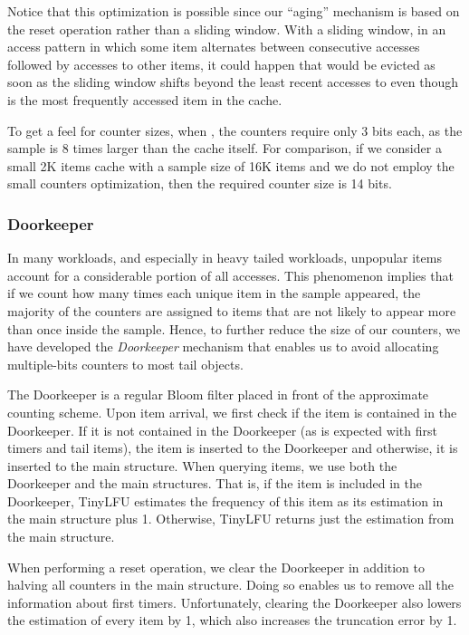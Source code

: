\documentclass[10pt,a4paper]{article}
\begin{document}
Notice that this optimization is possible since our ``aging'' mechanism is based on the reset operation rather than a sliding window.
With a sliding window, in an access pattern in which some item  alternates between  consecutive accesses followed by  accesses to other items, it could happen that  would be evicted as soon as the sliding window shifts beyond the least recent  accesses to  even though  is the most frequently accessed item in the cache.

To get a feel for counter sizes, when , the counters require only 3 bits each, as the sample is 8 times larger than the cache itself.
For comparison, if we consider a small 2K items cache with a sample size of 16K items and we do not employ the small counters optimization, then the required counter size is 14 bits.



\subsubsection{Doorkeeper}

In many workloads, and especially in heavy tailed workloads, unpopular items account for a considerable portion of all accesses.
This phenomenon implies that if we count how many times each unique item in the sample appeared, the majority of the counters are assigned to items that are not likely to appear more than once inside the sample.
Hence, to further reduce the size of our counters, we have developed the \emph{Doorkeeper} mechanism that enables us to avoid allocating multiple-bits
counters to most tail objects.

The Doorkeeper is a regular Bloom filter placed in front of the approximate counting scheme.
Upon item arrival, we first check if the item is contained in the Doorkeeper.
If it is not contained in the Doorkeeper (as is expected with first timers and tail items), the item is inserted to the Doorkeeper and otherwise, it is inserted to the main structure.
When querying items, we use both the Doorkeeper and the main structures.
That is, if the item is included in the Doorkeeper, TinyLFU estimates the frequency of this item as its estimation in the main structure plus 1.
Otherwise, TinyLFU returns just the estimation from the main structure.

When performing a reset operation, we clear the Doorkeeper in addition to halving all counters in the main structure.
Doing so enables us to remove all the information about first timers.
Unfortunately, clearing the Doorkeeper also lowers the estimation of every item by 1, which also increases the truncation error by 1.
\end{document}
